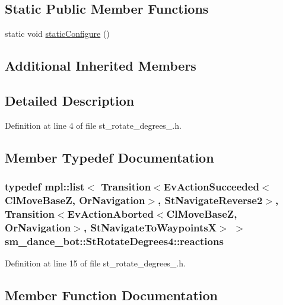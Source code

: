 \subsection*{Static Public Member Functions}
\begin{DoxyCompactItemize}
\item 
static void \hyperlink{structsm__dance__bot_1_1StRotateDegrees4_a8894152a14a5ca1d3324d973c79a569e}{static\+Configure} ()
\end{DoxyCompactItemize}
\subsection*{Additional Inherited Members}


\subsection{Detailed Description}


Definition at line 4 of file st\+\_\+rotate\+\_\+degrees\+\_.\+h.



\subsection{Member Typedef Documentation}
\subsubsection[{\texorpdfstring{reactions}{reactions}}]{\setlength{\rightskip}{0pt plus 5cm}typedef mpl\+::list$<$ Transition$<$Ev\+Action\+Succeeded$<${\bf Cl\+Move\+BaseZ}, {\bf Or\+Navigation}$>$, {\bf St\+Navigate\+Reverse2}$>$, Transition$<$Ev\+Action\+Aborted$<${\bf Cl\+Move\+BaseZ}, {\bf Or\+Navigation}$>$, {\bf St\+Navigate\+To\+WaypointsX}$>$ $>$ {\bf sm\+\_\+dance\+\_\+bot\+::\+St\+Rotate\+Degrees4\+::reactions}}\hypertarget{structsm__dance__bot_1_1StRotateDegrees4_a4850f13da169b79792836fa0319d0659}{}\label{structsm__dance__bot_1_1StRotateDegrees4_a4850f13da169b79792836fa0319d0659}


Definition at line 15 of file st\+\_\+rotate\+\_\+degrees\+\_.\+h.



\subsection{Member Function Documentation}
